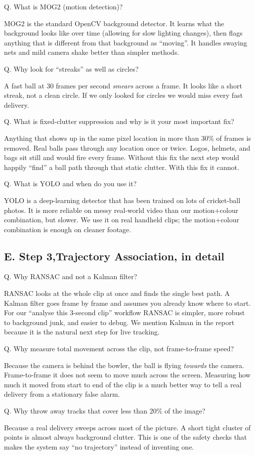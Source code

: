 \documentclass[11pt,a4paper]{article}
\newcommand{\qa}[2]{%
  \par\vspace{8pt}%
  \noindent
  \colorbox{NavyTint}{%
    \begin{minipage}{\dimexpr\textwidth-2\fboxsep\relax}%
      \color{white}\bfseries\strut Q. #1%
    \end{minipage}%
  }\par\nobreak
  \noindent
  \colorbox{MutedBg}{%
    \begin{minipage}{\dimexpr\textwidth-2\fboxsep\relax}%
      \color{black}\setlength{\parskip}{4pt}\strut #2\strut%
    \end{minipage}%
  }%
  \par\vspace{6pt}%
}
\begin{document}
\qa{What is MOG2 (motion detection)?}{%
MOG2 is the standard OpenCV background detector. It learns what the background looks like over time (allowing for slow lighting changes), then flags anything that is different from that background as ``moving''. It handles swaying nets and mild camera shake better than simpler methods.}

\qa{Why look for ``streaks'' as well as circles?}{%
A fast ball at 30 frames per second \emph{smears} across a frame. It looks like a short streak, not a clean circle. If we only looked for circles we would miss every fast delivery.}

\qa{What is fixed-clutter suppression and why is it your most important fix?}{%
Anything that shows up in the same pixel location in more than 30\% of frames is removed. Real balls pass through any location once or twice. Logos, helmets, and bags sit still and would fire every frame. Without this fix the next step would happily ``find'' a ball path through that static clutter. With this fix it cannot.}

\qa{What is YOLO and when do you use it?}{%
YOLO is a deep-learning detector that has been trained on lots of cricket-ball photos. It is more reliable on messy real-world video than our motion+colour combination, but slower. We use it on real handheld clips; the motion+colour combination is enough on cleaner footage.}

\subsection{E. Step 3,Trajectory Association, in detail}

\qa{Why RANSAC and not a Kalman filter?}{%
RANSAC looks at the whole clip at once and finds the single best path. A Kalman filter goes frame by frame and assumes you already know where to start. For our ``analyse this 3-second clip'' workflow RANSAC is simpler, more robust to background junk, and easier to debug. We mention Kalman in the report because it is the natural next step for live tracking.}

\qa{Why measure total movement across the clip, not frame-to-frame speed?}{%
Because the camera is behind the bowler, the ball is flying \emph{towards} the camera. Frame-to-frame it does not seem to move much across the screen. Measuring how much it moved from start to end of the clip is a much better way to tell a real delivery from a stationary false alarm.}

\qa{Why throw away tracks that cover less than 20\% of the image?}{%
Because a real delivery sweeps across most of the picture. A short tight cluster of points is almost always background clutter. This is one of the safety checks that makes the system say ``no trajectory'' instead of inventing one.}
\end{document}
